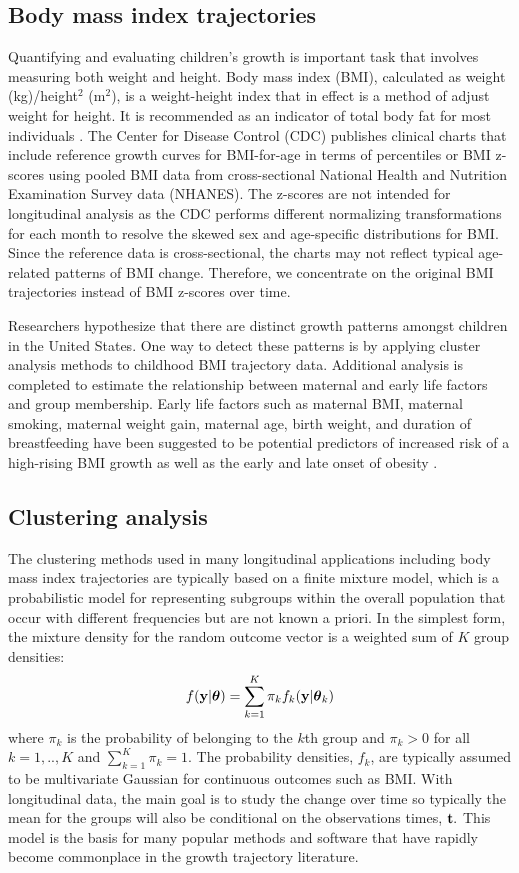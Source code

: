 \subsection{Body mass index trajectories}
Quantifying and evaluating children's growth is important task that involves measuring both weight and height. Body mass index (BMI), calculated as weight (kg)/height$^{2}$ (m$^{2}$), is a weight-height index that in effect is a method of adjust weight for height. It is recommended as an indicator of total body fat for most individuals \cite{roche1981}. The Center for Disease Control (CDC) publishes clinical charts that include reference growth curves for BMI-for-age in terms of percentiles or BMI z-scores using pooled BMI data from cross-sectional National Health and Nutrition Examination Survey data (NHANES). The z-scores are not intended for longitudinal analysis as the CDC performs different normalizing transformations for each month to resolve the skewed sex and age-specific distributions for BMI. Since the reference data is cross-sectional, the charts may not reflect typical age-related patterns of BMI change. Therefore, we concentrate on the original BMI trajectories instead of BMI z-scores over time.

Researchers hypothesize that there are distinct growth patterns amongst children in the United States. One way to detect these patterns is by applying cluster analysis methods to childhood BMI trajectory data. Additional analysis is completed to estimate the relationship between maternal and early life factors and group membership. Early life factors such as maternal BMI, maternal smoking, maternal weight gain, maternal age, birth weight, and duration of breastfeeding have been suggested to be potential predictors of increased risk of a high-rising BMI growth as well as the early and late onset of obesity \cite{pryor2011,carter2012,li2007}.

\subsection{Clustering analysis}
The clustering methods used in many longitudinal applications including body mass index trajectories are typically based on a finite mixture model, which is a probabilistic model for representing subgroups within the overall population that occur with different frequencies but are not known a priori. In the simplest form, the mixture density for the random outcome vector is a weighted sum of $K$ group densities:
$$f(\mathbf y|\boldsymbol\theta) = \sum^{K}_{k=1}\pi_{k}f_{k}(\mathbf y|\boldsymbol\theta_{k})$$
where $\pi_{k}$ is the probability of belonging to the $k$th group and $\pi_{k}>0$ for all $k=1,..,K$ and $\sum^{K}_{k=1}\pi_{k}=1$. The probability densities, $f_{k}$, are typically assumed to be multivariate Gaussian for continuous outcomes such as BMI. With longitudinal data, the main goal is to study the change over time so typically the mean for the groups will also be conditional on the observations times, $\mathbf t.$  This model is the basis for many popular methods and software that have rapidly become commonplace in the growth trajectory literature.

